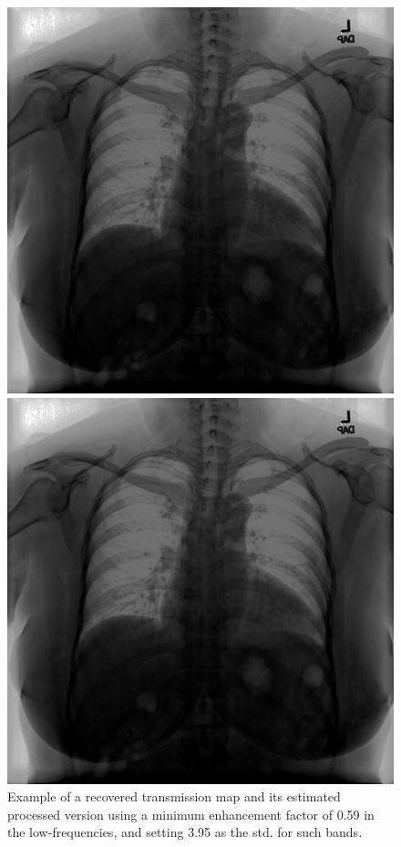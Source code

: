 \documentclass[nomenclature, english, bibtex]{kththesis}
\numberwithin{listing}{chapter}
\begin{document}
\begin{figure}[!tbp]
  \centering
  \begin{minipage}[b]{0.4\textwidth}
    \includegraphics[width=\textwidth]{figures/wrong_character_tm.png}
  \end{minipage}
  \begin{minipage}[b]{0.4\textwidth}
    \includegraphics[width=\textwidth]{figures/wrong_character_tm.png}
  \end{minipage}
  \hfill
  \caption{Example of a recovered transmission map and its estimated processed version using a minimum enhancement factor
  of 0.59 in the low-frequencies, and setting 3.95 as the std. for such bands.}
  \label{fig:wrongCharacterization}
\end{figure}
\end{document}
